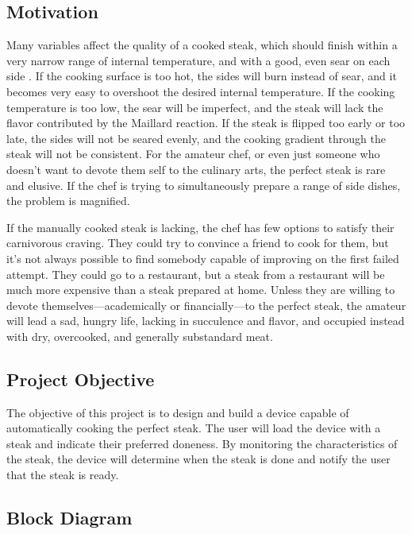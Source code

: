 \documentclass[11pt]{article}
\begin{document}
\subsection{Motivation}

Many variables affect the quality of a cooked steak, which should finish within a very narrow range of internal temperature, and with a good, even sear on each side \cite{doneness}.
If the cooking surface is too hot, the sides will burn instead of sear, and it becomes very easy to overshoot the desired internal temperature.
If the cooking temperature is too low, the sear will be imperfect, and the steak will lack the flavor contributed by the Maillard reaction.
If the steak is flipped too early or too late, the sides will not be seared evenly, and the cooking gradient through the steak will not be consistent.
For the amateur chef, or even just someone who doesn't want to devote them self to the culinary arts, the perfect steak is rare and elusive.
If the chef is trying to simultaneously prepare a range of side dishes, the problem is magnified.

If the manually cooked steak is lacking, the chef has few options to satisfy their carnivorous craving.
They could try to convince a friend to cook for them, but it’s not always possible to find somebody capable of improving on the first failed attempt.
They could go to a restaurant, but a steak from a restaurant will be much more expensive than a steak prepared at home.
Unless they are willing to devote themselves---academically or financially---to the perfect steak, the amateur will lead a sad, hungry life, lacking in succulence and flavor, and occupied instead with dry, overcooked, and generally substandard meat.

\subsection{Project Objective}

The objective of this project is to design and build a device capable of automatically cooking the perfect steak.
The user will load the device with a steak and indicate their preferred doneness.
By monitoring the characteristics of the steak, the device will determine when the steak is done and notify the user that the steak is ready.

\subsection{Block Diagram}
\end{document}
